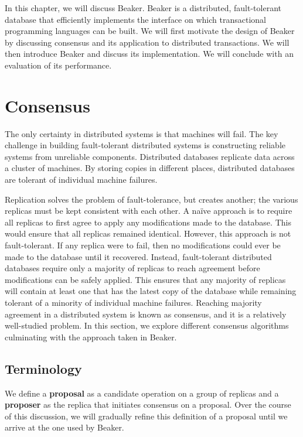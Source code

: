 \documentclass[../main.tex]{subfiles}
\begin{document}
In this chapter, we will discuss Beaker. Beaker is a distributed, fault-tolerant database that
efficiently implements the interface on which transactional programming languages can be built. We
will first motivate the design of Beaker by discussing consensus and its application to distributed
transactions. We will then introduce Beaker and discuss its implementation. We will conclude with an
evaluation of its performance.

\section{Consensus}
The only certainty in distributed systems is that machines will fail. The key challenge in building
fault-tolerant distributed systems is constructing reliable systems from unreliable components.
\cite{reliability} Distributed databases replicate data across a cluster of machines. By storing
copies in different places, distributed databases are tolerant of individual machine failures.

Replication solves the problem of fault-tolerance, but creates another; the various replicas must be
kept consistent with each other. A na\"ive approach is to require all replicas to first agree to
apply any modifications made to the database. This would ensure that all replicas remained
identical. However, this approach is not fault-tolerant. If any replica were to fail, then no
modifications could ever be made to the database until it recovered. Instead, fault-tolerant
distributed databases require only a majority of replicas to reach agreement before modifications
can be safely applied. This ensures that any majority of replicas will contain at least one that has
the latest copy of the database while remaining tolerant of a minority of individual machine
failures. Reaching majority agreement in a distributed system is known as consensus, and it is a
relatively well-studied problem. In this section, we explore different consensus algorithms
culminating with the approach taken in Beaker.

  \subsection{Terminology}
  We define a \textbf{proposal} as a candidate operation on a group of replicas and a
  \textbf{proposer} as the replica that initiates consensus on a proposal. Over the course of this
  discussion, we will gradually refine this definition of a proposal until we arrive at the one used
  by Beaker.
\end{document}
